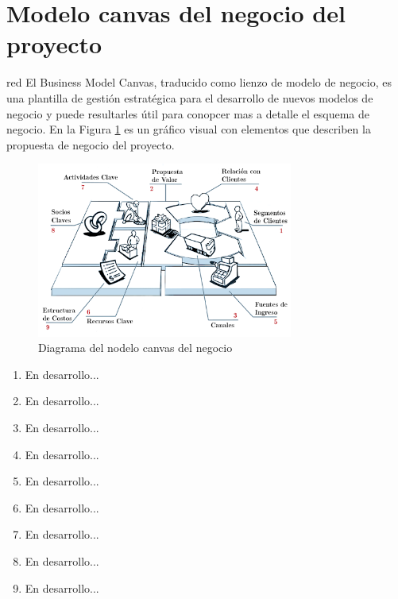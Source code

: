 \documentclass[11pt]{charter}
\begin{document}
\section{Modelo canvas del negocio del proyecto}
\begin{consigna}{red}
El Business Model Canvas, traducido como lienzo de modelo de negocio, es una plantilla de gestión estratégica para el desarrollo de nuevos modelos de negocio y puede resultarles útil para conopcer mas a detalle el esquema de negocio. En la Figura \ref{fig:diagCanvas}
es un gráfico visual con elementos que describen la propuesta de negocio del proyecto.
\vspace{25px}

\begin{figure}[htpb]
\centering 
\includegraphics[width=0.75\textwidth]{./Figuras/diagCanvas.png}
\caption{Diagrama del nodelo canvas del negocio}
\label{fig:diagCanvas}
\end{figure}

\begin{enumerate}
\item En desarrollo...
\item En desarrollo...
\item En desarrollo...
\item En desarrollo...
\item En desarrollo...
\item En desarrollo...
\item En desarrollo...
\item En desarrollo...
\item En desarrollo...

\end{enumerate}
\end{consigna}
\end{document}

